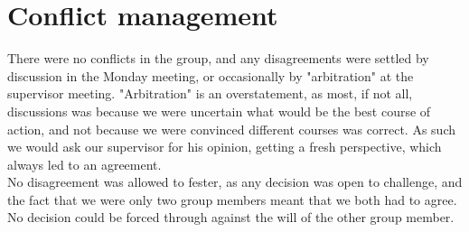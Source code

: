 \section{Conflict management}
There were no conflicts in the group, and any disagreements were settled by discussion in the Monday meeting, or occasionally by "arbitration" at the supervisor meeting. "Arbitration" is an overstatement, as most, if not all, discussions was because we were uncertain what would be the best course of action, and not because we were convinced different courses was correct. As such we would ask our supervisor for his opinion, getting a fresh perspective, which always led to an agreement.\\
No disagreement was allowed to fester, as any decision was open to challenge, and the
fact that we were only two group members meant that we both had to agree. No decision
could be forced through against the will of the other group member.
